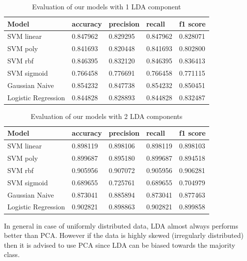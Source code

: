 \documentclass[a4paper,12pt]{article}
\begin{document}
\begin{table}[H]
\begin{tabular}{ |p{6cm}||p{2cm}|p{2cm}|p{2cm}|p{2cm}| }
  \hline
  Model& accuracy & precision  &  recall & f1 score \\
  \hline
  SVM linear&           0.847962&   0.829295&  0.847962&  0.828071\\
  SVM poly  &           0.841693&   0.820448&  0.841693&  0.802800\\
  SVM rbf   &           0.846395&   0.832120&  0.846395&  0.836413\\
  SVM sigmoid &         0.766458&   0.776691&  0.766458&  0.771115\\
  Gaussian Naive  &        0.854232&   0.847738&  0.854232&  0.850451\\
  Logistic Regression & 0.844828&   0.828893&  0.844828&  0.832487\\
  \hline
\end{tabular}
\caption{Evaluation of our models with 1 LDA component}
\label{tab:lda1}
\end{table}

\begin{table}[H]
\begin{tabular}{ |p{6cm}||p{2cm}|p{2cm}|p{2cm}|p{2cm}| }
  \hline
  Model& accuracy & precision  &  recall & f1 score \\
  \hline
  SVM linear &          0.898119&   0.898106&  0.898119&  0.898103\\
  SVM poly   &          0.899687&   0.895180&  0.899687&  0.894518\\
  SVM rbf    &          0.905956&   0.907072&  0.905956&  0.906281\\
  SVM sigmoid &         0.689655&   0.725761&  0.689655&  0.704979\\
  Gaussian Naive &         0.873041&   0.885894&  0.873041&  0.877463\\
  Logistic Regression&  0.902821&   0.898863&  0.902821&  0.899858\\
  \hline
\end{tabular}
\caption{Evaluation of our models with 2 LDA components}
\label{tab:lda2}
\end{table}


\noindent In general in case of uniformly distributed data, LDA almost always performs better than PCA. However if the data is highly skewed (irregularly distributed) then it is advised to use PCA since LDA can be biased towards the majority class.

\newpage
\end{document}
